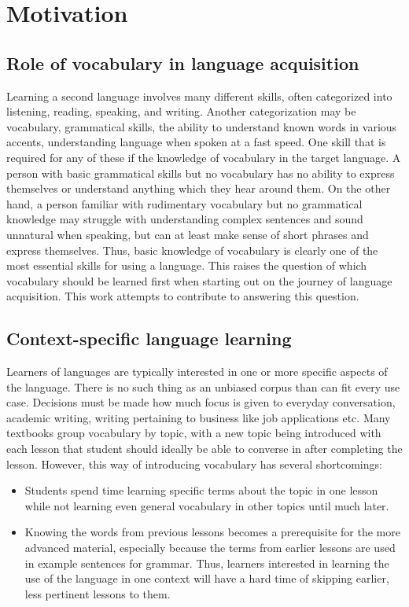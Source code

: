 \section{Motivation}
\subsection{Role of vocabulary in language acquisition}
Learning a second language involves many different skills, often categorized into listening, reading, speaking, and writing.
Another categorization may be vocabulary, grammatical skills, the ability to understand known words in various accents, understanding language when spoken at a fast speed.
One skill that is required for any of these if the knowledge of vocabulary in the target language.
A person with basic grammatical skills but no vocabulary has no ability to express themselves or understand anything which they hear around them.
On the other hand, a person familiar with rudimentary vocabulary but no grammatical knowledge may struggle with understanding complex sentences and sound unnatural when speaking, but can at least make sense of short phrases and express themselves.
Thus, basic knowledge of vocabulary is clearly one of the most essential skills for using a language.
This raises the question of which vocabulary should be learned first when starting out on the journey of language acquisition.
This work attempts to contribute to answering this question.


\subsection{Context-specific language learning}
Learners of languages are typically interested in one or more specific aspects of the language.
There is no such thing as an unbiased corpus than can fit every use case.
Decisions must be made how much focus is given to everyday conversation, academic writing, writing pertaining to business like job applications etc.
Many textbooks group vocabulary by topic, with a new topic being introduced with each lesson that student should ideally be able to converse in after completing the lesson.
However, this way of introducing vocabulary has several shortcomings:
\begin{itemize}
	\item Students spend time learning specific terms about the topic in one lesson while not learning even general vocabulary in other topics until much later.
	\item Knowing the words from previous lessons becomes a prerequisite for the more advanced material, especially because the terms from earlier lessons are used in example sentences for grammar.
	      Thus, learners interested in learning the use of the language in one context will have a hard time of skipping earlier, less pertinent lessons to them.
\end{itemize}

